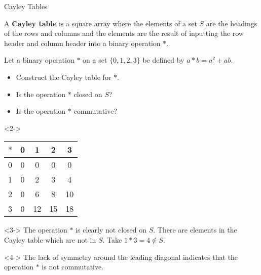 \documentclass[8pt]{beamer}
\begin{document}
\begin{frame}{Cayley Tables}
	\begin{definition}
		A \textbf{Cayley table} is a square array where the elements of a set $S$  are the headings of the rows and columns and the elements are the result of inputting the row header and column header into a binary operation $*$. 
	\end{definition}
	\begin{problem}
		Let a binary operation $*$ on a set  $\{0,1,2,3\}$ be defined by  $a*b=a^2+ab$.
		\begin{itemize}
			\item Construct the Cayley table for $*$.
			\item Is the operation  $*$ closed on  $S$?
			\item Is the operation  $*$ commutative?
		\end{itemize}
	\end{problem}
	\begin{solution}<2->
		\begin{center}
			\colorbox{cc!30}{
			\setlength\arrayrulewidth{0.5mm}
			\begin{tabular}{c|cccc}
				$*$ & 0 & 1 & 2 & 3 \\
				\hline
				0 & 0 & 0 & 0 & 0 \\
				1 & 0 & 2 & 3 & 4 \\
				2 & 0 & 6 & 8 & 10 \\
				3 & 0 & 12 & 15 & 18 \\
			\end{tabular}
		}
		\end{center}
	\end{solution}
	\begin{solution}<3->
		The operation $*$ is clearly not closed on  $S$. There are elements in the Cayley table which are not in  $S$. Take  $1*3=4\not\in S$.
	\end{solution}
	\begin{solution}<4->
		The lack of symmetry around the leading diagonal indicates that the operation $*$ is not commutative.
	\end{solution}
\end{frame}
\end{document}
